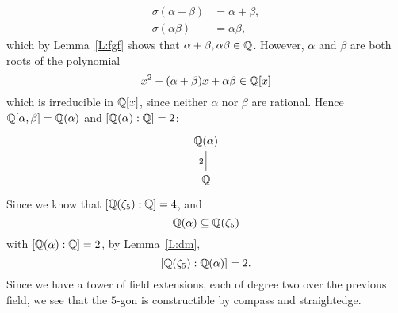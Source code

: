 \documentclass{ximera}
\begin{document}
\begin{example}
\begin{align*}
    \sigma(\alpha+\beta) &= \alpha + \beta,\\
    \sigma(\alpha\beta) &= \alpha\beta,
  \end{align*}
  which by Lemma~\ref{L:fgf} shows that
  $\alpha+\beta,\alpha\beta\in\mathbb Q$. However, $\alpha$ and $\beta$ are
  both roots of the polynomial
  \[
  x^2 - (\alpha +\beta) x + \alpha\beta\in\mathbb Q[x]
  \]
  which is irreducible in $\mathbb Q[x]$, since neither $\alpha$ nor $\beta$
  are rational. Hence $\mathbb Q[\alpha,\beta]= \mathbb Q(\alpha)$ and
  $[\mathbb Q(\alpha):\mathbb Q] = 2$:
  \[
  \begin{tikzcd}
    \Q(\alpha) \\ \Q \ar[u,-,"2"]
  \end{tikzcd}
  \]
  Since we know that $[\mathbb Q(\zeta_{5}):\mathbb Q] = 4$, and
  \[
  \mathbb Q(\alpha)\subseteq \mathbb Q(\zeta_{5})
  \]
  with $[\mathbb Q(\alpha):\mathbb Q]=2$, by Lemma~\ref{L:dm},
  \[
    [\mathbb Q(\zeta_{5}):\mathbb Q(\alpha)]=2.
  \]
  Since we have a tower of field extensions, each of degree two over
  the previous field, we see that the $5$-gon is constructible by
  compass and straightedge.
\end{example}
\end{document}
